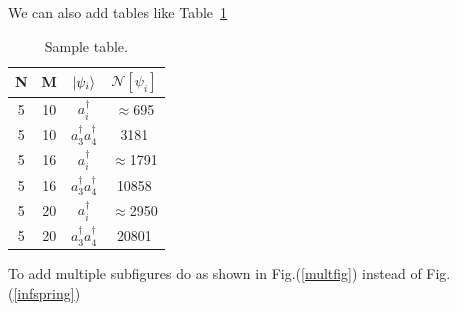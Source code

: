 We can also add tables like Table~\ref{tabdeloc}

\begin{table}[!h]

	\begin{center}

		\begin{tabular}{|c|c|c|c|}
			\hline N & M &  $\ket{\psi_i}$ & $\mathcal{N}[\psi_i]$ \\ 
			\hline 5 & 10 & $a^\dagger_i$ & $\approx$695 \\ 
			\hline 5 & 10 &  $a^\dagger_3a^\dagger_4$ & 3181 \\ 
			\hline 5 & 16 &  $a^\dagger_i$ & $\approx$1791 \\ 
			\hline 5 & 16 &  $a^\dagger_3a^\dagger_4$ & 10858 \\ 
			\hline 5 & 20 &  $a^\dagger_i$ & $\approx$2950 \\ 
			\hline 5 & 20 &  $a^\dagger_3a^\dagger_4$ & 20801 \\ 
			\hline 
		\end{tabular} 
	\end{center}
	\caption{Sample table. }\label{tabdeloc}
\end{table} 

To add multiple subfigures do as shown in Fig.(\ref{multfig}) instead of Fig.(\ref{infspring})


